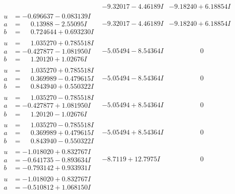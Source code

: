 \documentclass[1p]{elsarticle_modified}
\theoremstyle{definition}
\begin{document}
$$\begin{array}{c|c|c}
 & -9.32017 - 4.46189 I & -9.18240 + 6.18854 I \\ \hline\begin{aligned}
u &= -0.696637 - 0.083139 I \\
a &= \phantom{-}0.13988 - 2.55095 I \\
b &= \phantom{-}0.724644 + 0.693230 I\end{aligned}
 & -9.32017 - 4.46189 I & -9.18240 + 6.18854 I \\ \hline\begin{aligned}
u &= \phantom{-}1.035270 + 0.785518 I \\
a &= -0.427877 - 1.081950 I \\
b &= \phantom{-}1.20120 + 1.02676 I\end{aligned}
 & -5.05494 - 8.54364 I & \phantom{-0.000000 } 0 \\ \hline\begin{aligned}
u &= \phantom{-}1.035270 + 0.785518 I \\
a &= \phantom{-}0.369989 - 0.479615 I \\
b &= \phantom{-}0.843940 + 0.550322 I\end{aligned}
 & -5.05494 - 8.54364 I & \phantom{-0.000000 } 0 \\ \hline\begin{aligned}
u &= \phantom{-}1.035270 - 0.785518 I \\
a &= -0.427877 + 1.081950 I \\
b &= \phantom{-}1.20120 - 1.02676 I\end{aligned}
 & -5.05494 + 8.54364 I & \phantom{-0.000000 } 0 \\ \hline\begin{aligned}
u &= \phantom{-}1.035270 - 0.785518 I \\
a &= \phantom{-}0.369989 + 0.479615 I \\
b &= \phantom{-}0.843940 - 0.550322 I\end{aligned}
 & -5.05494 + 8.54364 I & \phantom{-0.000000 } 0 \\ \hline\begin{aligned}
u &= -1.018020 + 0.832767 I \\
a &= -0.641735 - 0.893634 I \\
b &= -0.793142 + 0.933931 I\end{aligned}
 & -8.7119 + 12.7975 I & \phantom{-0.000000 } 0 \\ \hline\begin{aligned}
u &= -1.018020 + 0.832767 I \\
a &= -0.510812 + 1.068150 I \\

\end{aligned}
\end{array}$$
\end{document}
